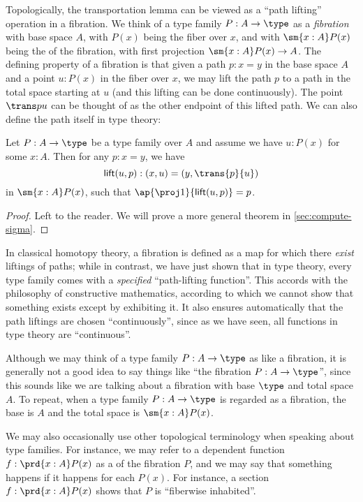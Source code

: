 Topologically, the transportation lemma can be viewed as a ``path lifting'' operation in a fibration.
%
%
We think of a type family $P:A\to \type$ as a \emph{fibration} with base space $A$, with $P(x)$ being the fiber over $x$, and with $\sm{x:A}P(x)$ being the  of the fibration, with first projection $\sm{x:A}P(x)\to A$.
The defining property of a fibration is that given a path $p:x=y$ in the base space $A$ and a point $u:P(x)$ in the fiber over $x$, we may lift the path $p$ to a path in the total space starting at $u$ (and this lifting can be done continuously).
The point $\trans p u$ can be thought of as the other endpoint of this lifted path.
We can also define the path itself in type theory:

\begin{lem}\label{thm:path-lifting}
  Let $P:A\to\type$ be a type family over $A$ and assume we have $u:P(x)$ for some $x:A$.
  Then for any $p:x=y$, we have
  \begin{equation*}
    \mathsf{lift}(u,p):(x,u)=(y,\trans{p}{u})
  \end{equation*}
  in $\sm{x:A}P(x)$, such that $\ap{\proj1}{\mathsf{lift}(u,p)} = p$.
\end{lem}
\begin{proof}
  Left to the reader.
  We will prove a more general theorem in \cref{sec:compute-sigma}.
\end{proof}

In classical homotopy theory, a fibration is defined as a map for which there \emph{exist} liftings of paths; while in contrast, we have just shown that in type theory, every type family comes with a \emph{specified} ``path-lifting function''.
This accords with the philosophy of constructive mathematics, according to which we cannot show that something exists except by exhibiting it.
%
It also ensures automatically that the path liftings are chosen ``continuously'', since as we have seen, all functions in type theory are ``continuous''.

\begin{rmk}
  Although we may think of a type family $P:A\to \type$ as like a fibration, it is generally not a good idea to say things like ``the fibration $P:A\to\type$'', since this sounds like we are talking about a fibration with base $\type$ and total space $A$.
  To repeat, when a type family $P:A\to \type$ is regarded as a fibration, the base is $A$ and the total space is $\sm{x:A} P(x)$.

  We may also occasionally use other topological terminology when speaking about type families.
  For instance, we may refer to a dependent function $f:\prd{x:A} P(x)$ as a 
  of the fibration $P$, and we may say that something happens 
  if it happens for each $P(x)$.
  For instance, a section $f:\prd{x:A} P(x)$ shows that $P$ is ``fiberwise inhabited''.
\end{rmk}

